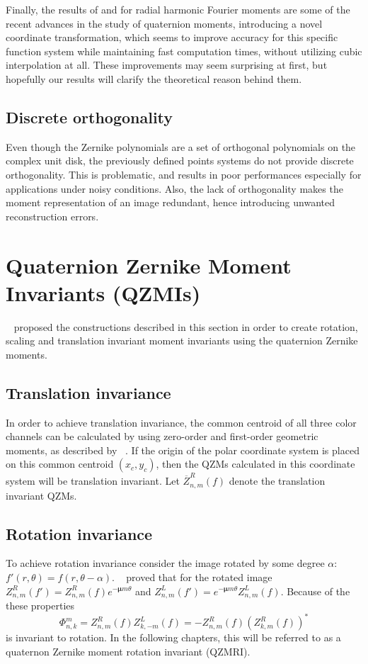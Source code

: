 Finally, the results of \citeauthor{WangAcc} \cite{WangAcc} and \citeauthor{LiuAcc} \cite{LiuAcc} for radial harmonic Fourier moments are some of the recent advances in the study of quaternion moments, introducing a novel coordinate transformation, which seems to improve accuracy for this specific function system while maintaining fast computation times, without utilizing cubic interpolation at all. These improvements may seem surprising at first, but hopefully our results will clarify the theoretical reason behind them.

\subsection{Discrete orthogonality}
Even though the Zernike polynomials are a set of orthogonal polynomials on the complex unit disk, the previously defined points systems do not provide discrete orthogonality. 
This is problematic, and results in poor performances especially for applications under noisy conditions.
Also, the lack of orthogonality makes the moment representation of an image redundant, hence introducing unwanted reconstruction errors.

\section{Quaternion Zernike Moment Invariants (QZMIs)}\label{sec:invariance}
\citeauthor{qzmi}~\cite{qzm, qzmi} proposed the constructions described in this section in order to create rotation, scaling and translation invariant moment invariants using the quaternion Zernike moments.

\subsection{Translation invariance}
In order to achieve translation invariance, the common centroid of all three color channels can be calculated by using zero-order and first-order geometric moments, as described by \citeauthor{affine_color}~\cite{affine_color}.
If the origin of the polar coordinate system is placed on this common centroid $(x_c, y_c)$, then the QZMs calculated in this coordinate system will be translation invariant. Let $\overline{Z}_{n,m}^R(f)$ denote the translation invariant QZMs.

\subsection{Rotation invariance}
To achieve rotation invariance consider the image rotated by some degree $\alpha$: $f'(r,\theta) = f(r, \theta - \alpha)$. \citeauthor{qzmi}~\cite{qzmi} proved that for the rotated image $Z_{n,m}^R(f') = Z_{n,m}^R(f)e^{-\bm{\mu}m\theta}$ and $Z_{n,m}^L(f') = e^{-\bm{\mu}m\theta}Z_{n,m}^L(f)$. Because of the these properties 
$$\Phi_{n,k}^m = Z_{n,m}^R(f)Z_{k,-m}^L(f) = -Z_{n,m}^R(f)(Z_{k,m}^R(f))^*$$
is invariant to rotation. In the following chapters, this will be referred to as a quaternon Zernike moment rotation invariant (QZMRI).

